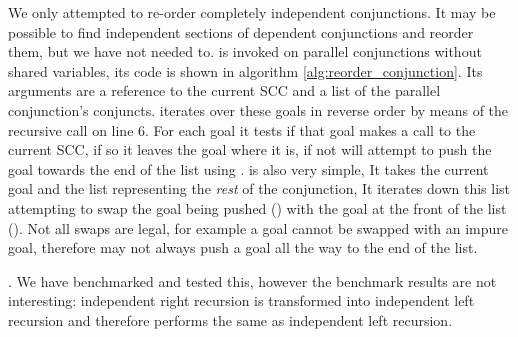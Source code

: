 We only attempted to re-order completely independent conjunctions.
It may be possible to find independent sections of dependent conjunctions
and reorder them,
but we have not needed to.
\reorder is invoked on parallel conjunctions without shared variables,
its code is shown in algorithm \ref{alg:reorder_conjunction}.
Its arguments are a reference to the current SCC and a list of the parallel
conjunction's conjuncts.
\reorder iterates over these goals in reverse order by means of the
recursive call on line 6.
For each goal it tests if that goal makes a call to the current SCC,
if so it leaves the goal where it is,
if not \reorder will attempt to push the goal towards the end of the
list using \trypushconjlater.
\trypushconjlater is also very simple,
It takes the current goal and the list representing the \emph{rest} of the
conjunction,
It iterates down this list attempting to swap the goal being pushed
() with the goal at the front of the list ().
Not all swaps are legal,
for example a goal cannot be swapped with an impure goal,
therefore \trypushconjlater may not always push a goal all the way to the
end of the list.

.
We have benchmarked and tested this,
however the benchmark results are not interesting:
independent right recursion is transformed into independent left
recursion and therefore performs the same as independent left recursion.

